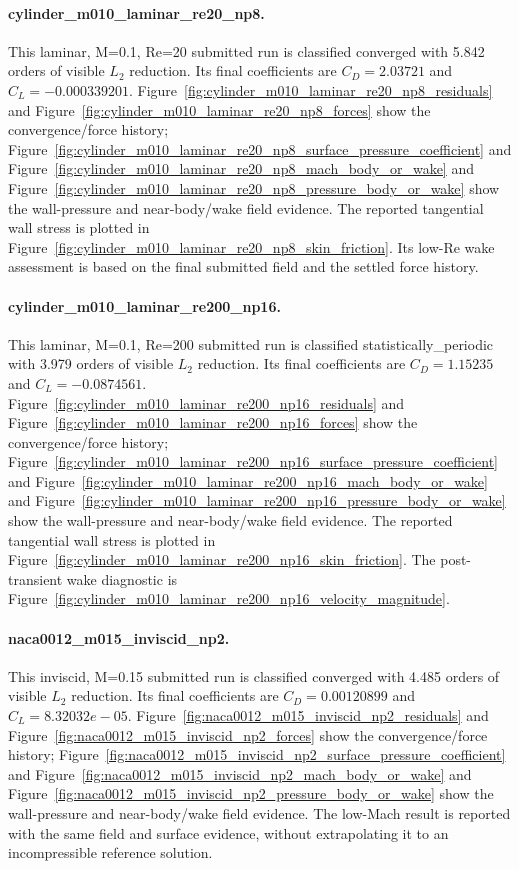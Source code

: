 \paragraph{cylinder\_m010\_laminar\_re20\_np8.} This laminar, M=0.1, Re=20 submitted run is classified converged with 5.842 orders of visible $L_2$ reduction. Its final coefficients are $C_D=2.03721$ and $C_L=-0.000339201$. Figure~\ref{fig:cylinder_m010_laminar_re20_np8_residuals} and Figure~\ref{fig:cylinder_m010_laminar_re20_np8_forces} show the convergence/force history; Figure~\ref{fig:cylinder_m010_laminar_re20_np8_surface_pressure_coefficient} and Figure~\ref{fig:cylinder_m010_laminar_re20_np8_mach_body_or_wake} and Figure~\ref{fig:cylinder_m010_laminar_re20_np8_pressure_body_or_wake} show the wall-pressure and near-body/wake field evidence. The reported tangential wall stress is plotted in Figure~\ref{fig:cylinder_m010_laminar_re20_np8_skin_friction}. Its low-Re wake assessment is based on the final submitted field and the settled force history.
\paragraph{cylinder\_m010\_laminar\_re200\_np16.} This laminar, M=0.1, Re=200 submitted run is classified statistically\_periodic with 3.979 orders of visible $L_2$ reduction. Its final coefficients are $C_D=1.15235$ and $C_L=-0.0874561$. Figure~\ref{fig:cylinder_m010_laminar_re200_np16_residuals} and Figure~\ref{fig:cylinder_m010_laminar_re200_np16_forces} show the convergence/force history; Figure~\ref{fig:cylinder_m010_laminar_re200_np16_surface_pressure_coefficient} and Figure~\ref{fig:cylinder_m010_laminar_re200_np16_mach_body_or_wake} and Figure~\ref{fig:cylinder_m010_laminar_re200_np16_pressure_body_or_wake} show the wall-pressure and near-body/wake field evidence. The reported tangential wall stress is plotted in Figure~\ref{fig:cylinder_m010_laminar_re200_np16_skin_friction}. The post-transient wake diagnostic is Figure~\ref{fig:cylinder_m010_laminar_re200_np16_velocity_magnitude}.
\paragraph{naca0012\_m015\_inviscid\_np2.} This inviscid, M=0.15 submitted run is classified converged with 4.485 orders of visible $L_2$ reduction. Its final coefficients are $C_D=0.00120899$ and $C_L=8.32032e-05$. Figure~\ref{fig:naca0012_m015_inviscid_np2_residuals} and Figure~\ref{fig:naca0012_m015_inviscid_np2_forces} show the convergence/force history; Figure~\ref{fig:naca0012_m015_inviscid_np2_surface_pressure_coefficient} and Figure~\ref{fig:naca0012_m015_inviscid_np2_mach_body_or_wake} and Figure~\ref{fig:naca0012_m015_inviscid_np2_pressure_body_or_wake} show the wall-pressure and near-body/wake field evidence. The low-Mach result is reported with the same field and surface evidence, without extrapolating it to an incompressible reference solution.
